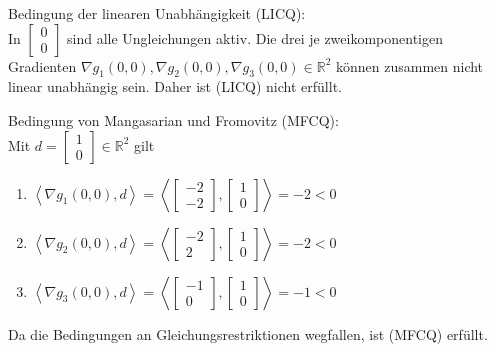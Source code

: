 \begin{compactenum}[(i)]
\item Bedingung der linearen Unabhängigkeit (LICQ):\\
In $\begin{bmatrix}0\\0\end{bmatrix}$ sind alle Ungleichungen aktiv. Die drei je zweikomponentigen Gradienten $\nabla g_1(0,0),\nabla g_2(0,0),\nabla g_3(0,0)\in\mathbb R^2$ können zusammen nicht linear unabhängig sein. Daher ist (LICQ) nicht erfüllt.\\
\item Bedingung von Mangasarian und Fromovitz (MFCQ):\\
Mit $d=\begin{bmatrix}1\\0\end{bmatrix}\in\mathbb R^2$ gilt
\begin{enumerate}
\item $\left\langle \nabla g_1(0,0),d\right\rangle=\left\langle \begin{bmatrix}-2\\-2\end{bmatrix},\begin{bmatrix}1\\0\end{bmatrix}\right\rangle=-2<0$
\item $\left\langle \nabla g_2(0,0),d\right\rangle=\left\langle \begin{bmatrix}-2\\2\end{bmatrix},\begin{bmatrix}1\\0\end{bmatrix}\right\rangle=-2<0$
\item $\left\langle \nabla g_3(0,0),d\right\rangle=\left\langle \begin{bmatrix}-1\\0\end{bmatrix},\begin{bmatrix}1\\0\end{bmatrix}\right\rangle=-1<0$
\end{enumerate}
Da die Bedingungen an Gleichungsrestriktionen wegfallen, ist (MFCQ) erfüllt.
\end{compactenum}
